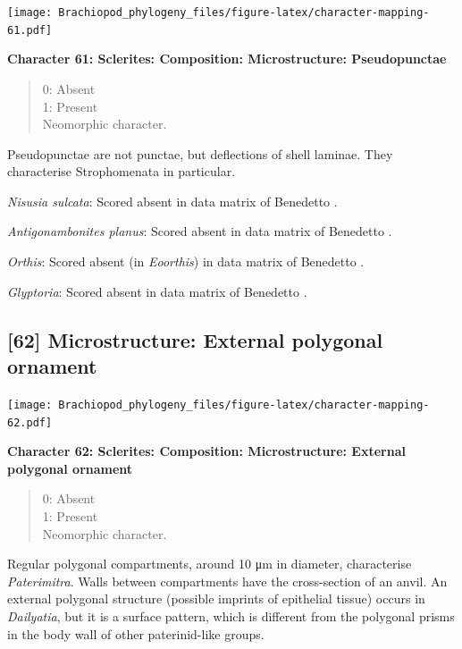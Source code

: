 \documentclass[]{book}
\theoremstyle{definition}
\theoremstyle{definition}
\theoremstyle{definition}
\theoremstyle{remark}
\begin{document}
\texttt{[image: Brachiopod\_phylogeny\_files/figure-latex/character-mapping-61.pdf]}

\textbf{Character 61: Sclerites: Composition: Microstructure:
Pseudopunctae}

\begin{quote}
0: Absent\\
1: Present\\
Neomorphic character.
\end{quote}

Pseudopunctae are not punctae, but deflections of shell laminae. They
characterise Strophomenata in particular.

\emph{Nisusia sulcata}: Scored absent in data matrix of Benedetto
\citeyearpar{Benedetto2009iChaniella}.

\emph{Antigonambonites planus}: Scored absent in data matrix of
Benedetto \citeyearpar{Benedetto2009iChaniella}.

\emph{Orthis}: Scored absent (in \emph{Eoorthis}) in data matrix of
Benedetto \citeyearpar{Benedetto2009iChaniella}.

\emph{Glyptoria}: Scored absent in data matrix of Benedetto
\citeyearpar{Benedetto2009iChaniella}.

\hypertarget{microstructure-external-polygonal-ornament}{%
\subsection*{{[}62{]} Microstructure: External polygonal
ornament}\label{microstructure-external-polygonal-ornament}}

\texttt{[image: Brachiopod\_phylogeny\_files/figure-latex/character-mapping-62.pdf]}

\textbf{Character 62: Sclerites: Composition: Microstructure: External
polygonal ornament}

\begin{quote}
0: Absent\\
1: Present\\
Neomorphic character.
\end{quote}

Regular polygonal compartments, around 10 μm in diameter, characterise
\emph{Paterimitra}. Walls between compartments have the cross-section of
an anvil. An external polygonal structure (possible imprints of
epithelial tissue) occurs in \emph{Dailyatia}, but it is a surface
pattern, which is different from the polygonal prisms in the body wall
of other paterinid-like groups.
\end{document}
